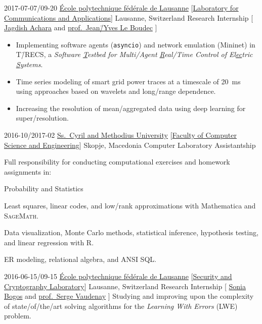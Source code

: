 \documentclass[version=last, fontsize=10pt, paper=A4, toc=bibliography]{scrartcl}%
\begin{document}
\WorkEntry%
{2017-07-07/09-20}%
{\href{https://epfl.ch/}{École polytechnique fédérale de Lausanne}}%
[\href{http://lca.epfl.ch/}{Laboratory for Communications and Applications}]%
{Lausanne, Switzerland}%
{Research Internship}%
[%
\href{https://people.epfl.ch/276750}{Jagdish Achara} and
\href{https://people.epfl.ch/jean-yves.leboudec}{prof.\ Jean\=/Yves Le Boudec}%
]%
{%
  \begin{itemize}[noitemsep, leftmargin=*]
  \item Implementing software agents (\texttt{asyncio}) and network
    emulation (Mininet) in T\=/RECS, a \emph{Software \underline{T}estbed for
      Multi\-/Agent \underline{R}eal\-/Time Control of El\underline{ec}tric
      \underline{S}ystems}.
  \item Time series modeling of smart grid power traces at a timescale of
    \SI{20}{\ms} using approaches based on wavelets and long\-/range dependence.
  \item Increasing the resolution of mean\-/aggregated data using deep learning
    for super\-/resolution.
  \end{itemize}%
}

\WorkEntry%
{2016-10/2017-02}%
{\href{http://ukim.edu.mk/}{Ss.\ Cyril and Methodius University}}%
[\href{https://finki.ukim.mk/}{Faculty of Computer Science and Engineering}]%
{Skopje, Macedonia}%
{Computer Laboratory Assistantship}%
{%
  Full responsibility for conducting computational exercises and homework
  assignments in:
  \begin{labeling}{Probability and Statistics}
  \item[Linear Algebra] Least squares, linear codes, and low\-/rank
    approximations with Mathematica\textregistered{} and \textsc{SageMath}.
  \item[Probability and Statistics] Data visualization, Monte Carlo methods,
    statistical inference, hypothesis testing, and linear regression with R.
  \item[Databases] ER modeling, relational algebra, and ANSI SQL\@.
  \end{labeling}%
}

\WorkEntry%
{2016-06-15/09-15}%
{\href{https://epfl.ch/}{École polytechnique fédérale de Lausanne}}%
[\href{https://lasec.epfl.ch/}{Security and Cryptography Laboratory}]%
{Lausanne, Switzerland}%
{Research Internship}%
[%
\href{https://lasec.epfl.ch/~bogos/}{Sonia Bogos} and
\href{https://lasec.epfl.ch/~vaudenay/}{prof.\ Serge Vaudenay}%
]%
{%
  Studying and improving upon the complexity of state\-/of\-/the\-/art solving
  algorithms for the \emph{Learning With Errors} (LWE) problem.%
}
\end{document}
